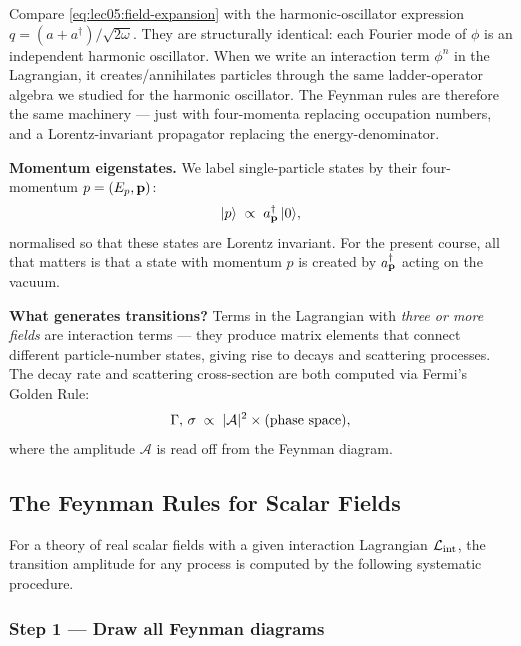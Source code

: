 \documentclass[../main.tex]{subfiles}
\begin{document}
\begin{remark}
Compare \eqref{eq:lec05:field-expansion} with the harmonic-oscillator expression $q = (a + a^\dagger)/\sqrt{2\omega}$.  They are structurally identical: each Fourier mode of $\phi$ is an independent harmonic oscillator.  When we write an interaction term $\phi^n$ in the Lagrangian, it creates/annihilates particles through the same ladder-operator algebra we studied for the harmonic oscillator.  The Feynman rules are therefore the same machinery — just with four-momenta replacing occupation numbers, and a Lorentz-invariant propagator replacing the energy-denominator.
\end{remark}

\textbf{Momentum eigenstates.}  We label single-particle states by their four-momentum $p = (E_p, \mathbf{p})$:
\begin{equation}
  |p\rangle \;\propto\; a_{\mathbf{p}}^\dagger\, |0\rangle,
  \label{eq:lec05:momentum-state}
\end{equation}
normalised so that these states are Lorentz invariant.  For the present course, all that matters is that a state with momentum $p$ is created by $a_{\mathbf{p}}^\dagger$ acting on the vacuum.

\textbf{What generates transitions?}  Terms in the Lagrangian with \emph{three or more fields} are interaction terms — they produce matrix elements that connect different particle-number states, giving rise to decays and scattering processes.  The decay rate and scattering cross-section are both computed via Fermi's Golden Rule:
\begin{equation}
  \Gamma,\,\sigma \;\propto\; |\mathcal{A}|^2 \times \text{(phase space)},
  \label{eq:lec05:FGR-compact}
\end{equation}
where the amplitude $\mathcal{A}$ is read off from the Feynman diagram.

\subsection*{The Feynman Rules for Scalar Fields}

For a theory of real scalar fields with a given interaction Lagrangian $\mathcal{L}_{\mathrm{int}}$, the transition amplitude for any process is computed by the following systematic procedure.

\subsubsection*{Step 1 — Draw all Feynman diagrams}
\end{document}
